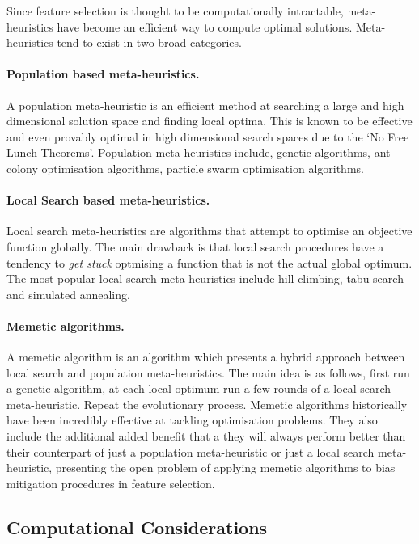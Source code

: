 \documentclass[conference]{IEEEtran}
\begin{document}
Since feature selection is thought to be computationally intractable, meta-heuristics have become an efficient way to compute optimal solutions. Meta-heuristics tend to exist in two broad categories.

\paragraph{Population based meta-heuristics.} A population meta-heuristic is an efficient method at searching a large and high dimensional solution space and finding local optima. This is known to be effective and even provably optimal in high dimensional search spaces due to the `No Free Lunch Theorems'. Population meta-heuristics include, genetic algorithms, ant-colony optimisation algorithms, particle swarm optimisation algorithms.

\paragraph{Local Search based meta-heuristics.} Local search meta-heuristics are algorithms that attempt to optimise an objective function globally. The main drawback is that local search procedures have a tendency to \textit{get stuck} optmising a function that is not the actual global optimum. The most popular local search meta-heuristics include hill climbing, tabu search and simulated annealing.

\paragraph{Memetic algorithms.} A memetic algorithm is an algorithm which presents a hybrid approach between local search and population meta-heuristics. The main idea is as follows, first run a genetic algorithm, at each local optimum run a few rounds of a local search meta-heuristic. Repeat the evolutionary process. Memetic algorithms historically have been incredibly effective at tackling optimisation problems. They also include the additional added benefit that a they will always perform better than their counterpart of just a population meta-heuristic or just a local search meta-heuristic, presenting the open problem of applying memetic algorithms to bias mitigation procedures in feature selection.

\subsection{Computational Considerations}
\end{document}
